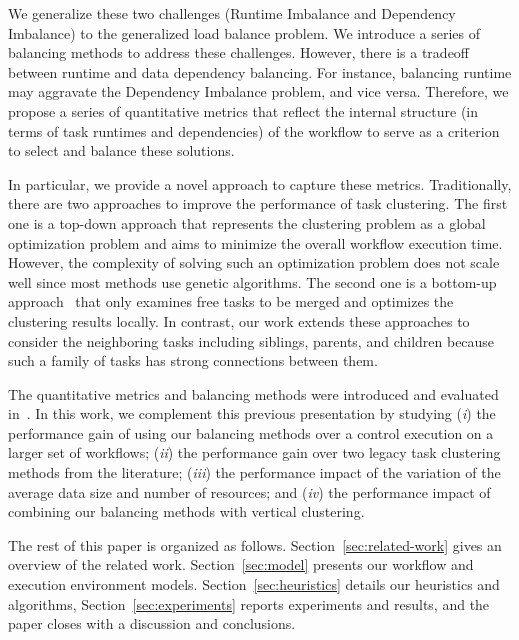 We generalize these two challenges (Runtime Imbalance and Dependency Imbalance) to the generalized load balance problem. We introduce a series of balancing methods to address these challenges. However, there is a tradeoff between runtime and data dependency balancing. For instance, balancing runtime may aggravate the Dependency Imbalance problem, and vice versa. Therefore, we propose a series of quantitative metrics that reflect the internal structure (in terms of task runtimes and dependencies) of the workflow to serve as a criterion to select and balance these solutions.

In particular, we provide a novel approach to capture these metrics. Traditionally, there are two approaches to improve the performance of task clustering. The first one is a top-down approach \cite{6217508} that represents the clustering problem as a global optimization problem and aims to minimize the overall workflow execution time. However, the complexity of solving such an optimization problem does not scale well since most methods use genetic algorithms. The second one is a bottom-up approach~\cite{Muthuvelu:2005:DJG:1082290.1082297,Liu2009} that only examines free tasks to be merged and optimizes the clustering results locally. In contrast, our work extends these approaches to consider the neighboring tasks including siblings, parents, and children because such a family of tasks has strong connections between them. 

The quantitative metrics and balancing methods were introduced and evaluated in~\cite{6683907}. In this work, we complement this previous presentation by studying (\emph{i}) the performance gain of using our balancing methods over a control execution on a larger set of workflows; (\emph{ii}) the performance gain over two legacy task clustering methods from the literature; (\emph{iii}) the performance impact of the variation of the average data size and number of resources; and (\emph{iv}) the performance impact of combining our balancing methods with vertical clustering.

The rest of this paper is organized as follows. Section~\ref{sec:related-work} gives an overview of the related work. Section~\ref{sec:model} presents our workflow and execution environment models. Section~\ref{sec:heuristics} details our heuristics and algorithms, Section~\ref{sec:experiments} reports experiments and results, and the paper closes with a discussion and conclusions.

